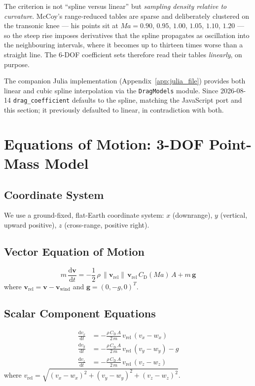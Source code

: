 \documentclass[11pt,twoside,openright]{report}
\newcommand{\dd}{\mathrm{d}}
\newcommand{\Cd}{C_{\mathrm{D}}}
\newcommand{\vvec}{\bm{v}}
\newcommand{\gvec}{\bm{g}}
\newcommand{\Mach}{\mathit{Ma}}
\begin{document}
The criterion is not ``spline versus linear'' but \emph{sampling density relative to
curvature}. McCoy's range-reduced tables are sparse and deliberately clustered on the
transonic knee --- his points sit at $\Mach = 0.90$, $0.95$, $1.00$, $1.05$, $1.10$,
$1.20$ --- so the steep rise imposes derivatives that the spline propagates as
oscillation into the neighbouring intervals, where it becomes up to thirteen times
worse than a straight line. The 6-DOF coefficient sets therefore read their tables
\emph{linearly}, on purpose.

The companion Julia implementation (Appendix~\ref{app:julia_file}) provides both linear and cubic spline interpolation via the \texttt{DragModels} module. Since 2026-08-14 \texttt{drag\_coefficient} defaults to the spline, matching the JavaScript port and this section; it previously defaulted to linear, in contradiction with both.

\section{Equations of Motion: 3-DOF Point-Mass Model}
\label{sec:3dof}

\subsection{Coordinate System}

We use a ground-fixed, flat-Earth coordinate system: $x$ (downrange), $y$ (vertical, upward positive), $z$ (cross-range, positive right).

\subsection{Vector Equation of Motion}

\begin{equation}
  \boxed{m\,\frac{\dd \vvec}{\dd t} = -\frac{1}{2}\,\rho\,\|\vvec_{\mathrm{rel}}\|\,\vvec_{\mathrm{rel}}\,\Cd(\Mach)\,A + m\,\gvec}
  \label{eq:3dof_vector}
\end{equation}
where $\vvec_{\mathrm{rel}} = \vvec - \vvec_{\mathrm{wind}}$ and $\gvec = (0, -g, 0)^T$.

\subsection{Scalar Component Equations}

\begin{align}
  \frac{\dd v_x}{\dd t} &= -\frac{\rho\,\Cd\,A}{2\,m}\,v_{\mathrm{rel}}\,(v_x - w_x) \label{eq:3dof_x}\\
  \frac{\dd v_y}{\dd t} &= -\frac{\rho\,\Cd\,A}{2\,m}\,v_{\mathrm{rel}}\,(v_y - w_y) - g \label{eq:3dof_y}\\
  \frac{\dd v_z}{\dd t} &= -\frac{\rho\,\Cd\,A}{2\,m}\,v_{\mathrm{rel}}\,(v_z - w_z) \label{eq:3dof_z}
\end{align}
where $v_{\mathrm{rel}} = \sqrt{(v_x-w_x)^2 + (v_y-w_y)^2 + (v_z-w_z)^2}$.
\end{document}
